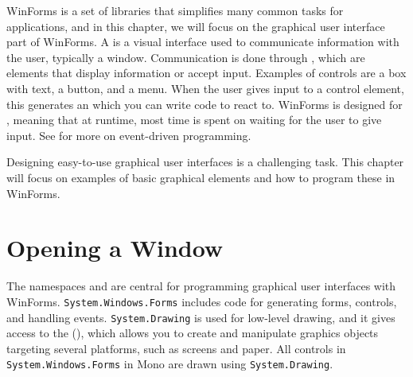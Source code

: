 \documentclass[fsharpNotes.tex]{subfiles}
\begin{document}
WinForms is a set of libraries that simplifies many common tasks for applications, and in this chapter, we will focus on the graphical user interface part of WinForms. A  is a visual interface used to communicate information with the user, typically a window. Communication is done through , which are elements that display information or accept input. Examples of controls are a box with text, a button, and a menu. When the user gives input to a control element, this generates an  which you can write code to react to. WinForms is designed for , meaning that at runtime, most time is spent on waiting for the user to give input. See  for more on event-driven programming.

Designing easy-to-use graphical user interfaces is a challenging task. This chapter will focus on examples of basic graphical elements and how to program these in WinForms.

\section{Opening a Window}
The namespaces  and  are central for programming graphical user interfaces with WinForms. \lstinline{System.Windows.Forms} includes code for generating forms, controls, and handling events. \lstinline{System.Drawing} is used for low-level drawing, and it gives access to the  (), which allows you to create and manipulate graphics objects targeting several platforms, such as screens and paper. All controls in \lstinline{System.Windows.Forms} in Mono are drawn using \lstinline{System.Drawing}. 
\end{document}

